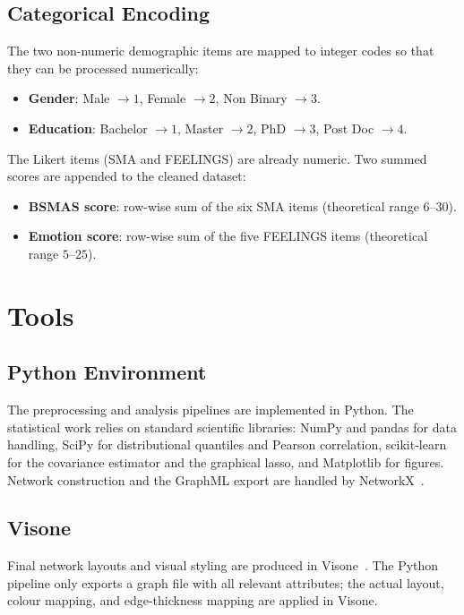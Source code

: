 \documentclass{article}
\begin{document}
\subsection{Categorical Encoding}
The two non-numeric demographic items are mapped to integer codes so that
they can be processed numerically:
\begin{itemize}
    \item \textbf{Gender}: Male $\to 1$, Female $\to 2$, Non Binary $\to 3$.
    \item \textbf{Education}: Bachelor $\to 1$, Master $\to 2$,
        PhD $\to 3$, Post Doc $\to 4$.
\end{itemize}

The Likert items (SMA and FEELINGS) are already numeric. Two summed
scores are appended to the cleaned dataset:
\begin{itemize}
    \item \textbf{BSMAS score}: row-wise sum of the six SMA items
        (theoretical range $6$--$30$).
    \item \textbf{Emotion score}: row-wise sum of the five FEELINGS items
        (theoretical range $5$--$25$).
\end{itemize}

\section{Tools}

\subsection{Python Environment}
The preprocessing and analysis pipelines are implemented in Python. The
statistical work relies on standard scientific libraries: NumPy and pandas
for data handling, SciPy for distributional quantiles and Pearson
correlation, scikit-learn~\parencite{pedregosa2011scikit} for the
covariance estimator and the graphical lasso, and Matplotlib for figures.
Network construction and the GraphML export are handled by
NetworkX~\parencite{hagberg2008networkx}.

\subsection{Visone}
Final network layouts and visual styling are produced in
Visone~\parencite{brandes2004visone}. The Python pipeline only exports a
graph file with all relevant attributes; the actual layout, colour
mapping, and edge-thickness mapping are applied in Visone.
\end{document}
